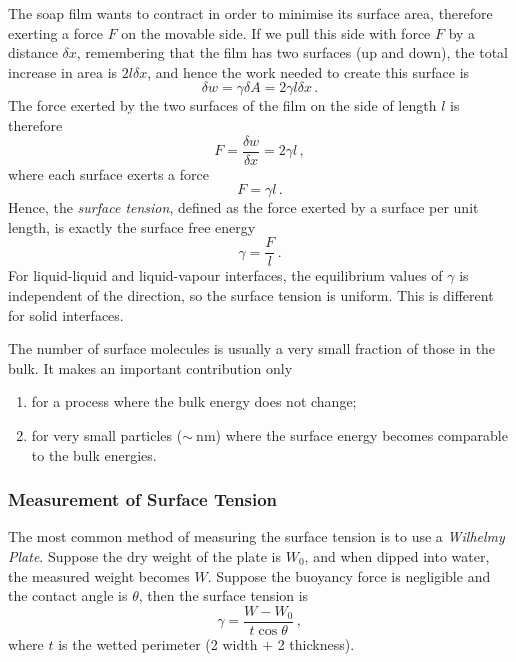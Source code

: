 \documentclass{article}
\theoremstyle{plain}\theoremheaderfont{\normalfont\itshape}\theorembodyfont{\rmfamily}\theoremseparator{.}\newtheorem*{rem}{Remark}\newtheorem*{ex}{Example}\newtheorem*{proof}{Proof}\newtheorem*{altp}{Alternative proof}
\theoremstyle{plain}\theoremheaderfont{\normalfont\bfseries}\theorembodyfont{\rmfamily}\theoremseparator{.}\newtheorem{thm}{Theorem}[section]\newtheorem{lem}[thm]{Lemma}\newtheorem{prop}[thm]{Proposition}\newtheorem*{cor}{Corollary}\newtheorem{defn}[thm]{Definition}\newtheorem{clm}[thm]{Claim}\newtheorem{clminproof}{Claim}\newtheorem*{law}{Law}\newtheorem{pos}[thm]{Postulate}
\theoremstyle{break}\theoremheaderfont{\normalfont\itshape}\theorembodyfont{\rmfamily}\theoremseparator{.\medskip}\newtheorem*{proofskip}{Proof}\newtheorem*{exs}{Examples}\newtheorem*{rems}{Remarks}
\theoremstyle{break}\theoremheaderfont{\normalfont\bfseries}\theorembodyfont{\rmfamily}\theoremseparator{.\medskip}\newtheorem{lemskip}[thm]{Lemma}\newtheorem{defnskip}[thm]{Definition}\newtheorem{propskip}[thm]{Proposition}\newtheorem{thmskip}[thm]{Theorem}
\numberwithin{equation}{section}
\newcommand{\unit}[1]{\ \mathrm{#1}}
\begin{document}
	The soap film wants to contract in order to minimise its surface area, therefore exerting a force \(F\) on the movable side. If we pull this side with force \(F\) by a distance \(\delta x\), remembering that the film has two surfaces (up and down), the total increase in area is \(2l\delta x\), and hence the work needed to create this surface is
	\begin{equation}
		\delta w=\gamma\delta A=2\gamma l\delta x\,.
	\end{equation}
	The force exerted by the two surfaces of the film on the side of length \(l\) is therefore
	\begin{equation}
		F=\frac{\delta w}{\delta x}=2\gamma l\,,
	\end{equation}
	where each surface exerts a force
	\begin{equation}
		F=\gamma l\,.
	\end{equation}
	Hence, the \textit{surface tension}, defined as the force exerted by a surface per unit length, is exactly the surface free energy
	\begin{equation}
		\gamma=\frac{F}{l}\,.
	\end{equation}
	For liquid-liquid and liquid-vapour interfaces, the equilibrium values of \(\gamma\) is independent of the direction, so the surface tension is uniform. This is different for solid interfaces.

	The number of surface molecules is usually a very small fraction of those in the bulk. It makes an important contribution only
	\begin{enumerate}[topsep=0pt,label=(\roman*)]
		\item for a process where the bulk energy does not change;
		\item for very small particles (\(\sim\unit{nm}\)) where the surface energy becomes comparable to the bulk energies.
	\end{enumerate}

	\subsubsection{Measurement of Surface Tension}
	The most common method of measuring the surface tension is to use a \textit{Wilhelmy Plate}. Suppose the dry weight of the plate is \(W_0\), and when dipped into water, the measured weight becomes \(W\). Suppose the buoyancy force is negligible and the contact angle is \(\theta\), then the surface tension is
	\begin{equation}
		\gamma=\frac{W-W_0}{t\cos\theta}\,,
	\end{equation}
	where \(t\) is the wetted perimeter (2 width \(+\) 2 thickness).
\end{document}
